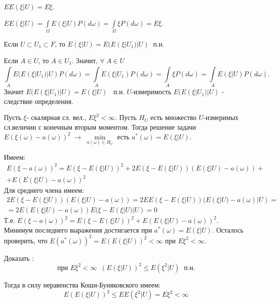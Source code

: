 \begin{clair}\label{lec:6/clair:5}
	$\displaystyle EE(\xi|U) = E\xi$.
\end{clair}
\begin{Proof}
	$\displaystyle EE(\xi|U) = \int\limits^{}_{\Omega}E(\xi|U)P(d\omega)=\int\limits^{}_{\Omega}\xi P(d\omega) = E\xi$.
\end{Proof}

\begin{clair}\label{lec:6/clair:6}
	Если $U \subset U_1 \subset F$, то $\displaystyle E(\xi|U) = E (E(\xi|U_1)|U)\; \text{ п.н.}$
\end{clair}
\begin{Proof}
	Если $A\in U$, то $A \in U_1$. Значит, $\forall\;A \in U$ 
	\[\int\limits^{}_{A}E(E(\xi|U_1)|U)P(d\omega) = \int\limits^{}_{A}E(\xi|U_1)P(d\omega) = \int\limits^{}_{A}\xi P(d\omega) = \int\limits^{}_{A}E(\xi|U)P(d\omega).\]
	Значит $\displaystyle E(E(\xi|U_1)|U) = E(\xi|U)\;\;\text{ п.н.}$ $U$-измеримость $E(E(\xi|U_1)|U)$ - следствие определения.
\end{Proof}

\begin{clair}\label{lec:6/clair:7}
	Пусть $\xi$- скалярная сл. вел., $E\xi^2<\infty$. Пусть $H_U$ есть множество $U$-измеримых сл.величин с конечным вторым моментом. Тогда решение задачи $\displaystyle E(\xi(\omega) - a(\omega))^2\;\rightarrow\;\min\limits_{a(\omega)\in H_U}$ есть $a^*(\omega) = E(\xi|U)$.
\end{clair}
\begin{Proof}
	Имеем:
	$$\begin{gathered}
		E(\xi - a(\omega))^2 = E(\xi - E(\xi|U))^2 + 2E(\xi - E(\xi|U))(E(\xi|U) - a(\omega)) + \\
		+ E(E(\xi|U) -a(\omega))^2 
	\end{gathered}$$
	Для среднего члена имеем:
	\begin{gather*}
		2E(\xi - E(\xi|U))(E(\xi|U) - a(\omega)) = 2EE(\xi - E(\xi|U))(E(\xi|U) - a(\omega)|U) =\\
		=2E(E(\xi|U)-a(\omega))E(\xi-E(\xi|U)|U) = 0
	\end{gather*}
	Т.е. $\displaystyle E(\xi - a(\omega))^2 = E(\xi - E(\xi|U))^2 + E(E(\xi|U) - a(\omega))^2$. Минимум последнего выражения достигается при $\displaystyle a^*(\omega) = E(\xi|U)$. Осталось проверить, что $\displaystyle E(a^*(\omega))^2 = E(E(\xi|U))^2 < \infty$ при $E\xi^2 < \infty$.
	\begin{problem}
		Доказать : 
		$$\text{при } E\xi^2 < \infty \;\; (E(\xi|U))^2 \leq E(\xi^2|U) \; \text{ п.н.}$$
	\end{problem}
	Тогда в силу неравенства Коши-Буняковского имеем:
	$$E(E(\xi|U))^2 \leq EE(\xi^2|U) = E\xi^2 < \infty$$
\end{Proof}

